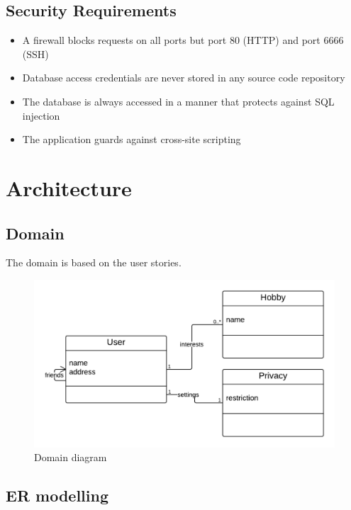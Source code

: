 \documentclass[a4paper]{article}
\begin{document}
\subsection{Security Requirements}
\begin{itemize}
\item A firewall blocks requests on all ports but port 80 (HTTP) and port 6666 (SSH)
\item Database access credentials are never stored in any source code repository
\item The database is always accessed in a manner that protects against SQL injection
\item The application guards against cross-site scripting
\end{itemize}

\section{Architecture}

\subsection{Domain}
The domain is based on the user stories.

\begin{figure}[h!]
\centering
\includegraphics[scale=0.3]{Domain}
\caption{Domain diagram}
\label{fig:domain_diagram}
\end{figure}

\subsection{ER modelling}
\end{document}
